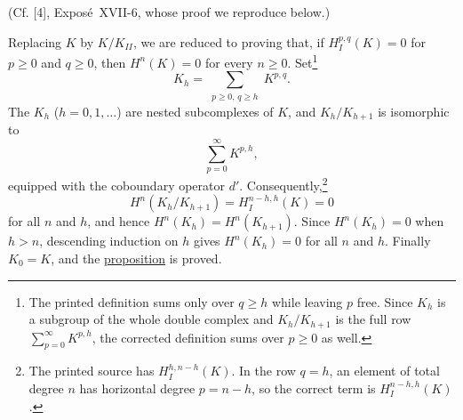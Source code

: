 (Cf. [4], Exposé~XVII-6, whose proof we reproduce below.)

Replacing $K$ by $K/K_{II}$, we are reduced to proving that, if $H_I^{p,q}(K)=0$ for $p\geq0$ and $q\geq0$, then $H^n(K)=0$ for every $n\geq0$. Set\footnote{The printed definition sums only over $q\geq h$ while leaving $p$ free. Since $K_h$ is a subgroup of the whole double complex and $K_h/K_{h+1}$ is the full row $\sum_{p=0}^{\infty}K^{p,h}$, the corrected definition sums over $p\geq0$ as well.}
\[
K_h=\sum_{\substack{p\geq0,\,q\geq h}}K^{p,q}.
\]
The $K_h$ ($h=0,1,\ldots$) are nested subcomplexes of $K$, and $K_h/K_{h+1}$ is isomorphic to
\[
\sum_{p=0}^{\infty}K^{p,h},
\]
equipped with the coboundary operator $d'$. Consequently,\footnote{The printed source has $H_I^{h,n-h}(K)$. In the row $q=h$, an element of total degree $n$ has horizontal degree $p=n-h$, so the correct term is $H_I^{n-h,h}(K)$.}
\[
H^n(K_h/K_{h+1})=H_I^{n-h,h}(K)=0
\]
for all $n$ and $h$, and hence $H^n(K_h)=H^n(K_{h+1})$. Since $H^n(K_h)=0$ when $h>n$, descending induction on $h$ gives $H^n(K_h)=0$ for all $n$ and $h$. Finally $K_0=K$, and the \hyperref[fac:I:4:no:27:prop:1]{proposition} is proved.
